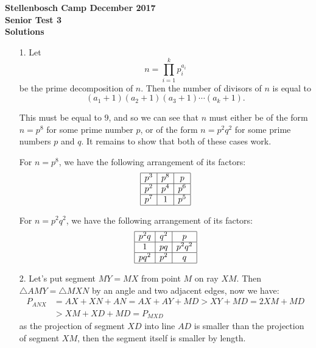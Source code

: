 \documentclass[a4paper, 12pt]{article}
\begin{document}
\begin{center}
\textbf{Stellenbosch Camp December 2017 \\ Senior Test 3} \\
\textbf{Solutions}
\end{center}

\begin{enumerate}

    \item[1.] Let
    \[
        n = \prod_{i=1}^{k} p_i^{a_i}
    \]
    be the prime decomposition of $n$. Then the number of divisors of $n$ is
    equal to
    \[
        (a_1 + 1)(a_2 + 1)(a_3 + 1) \cdots (a_k + 1).
    \]

    This must be equal to $9$, and so we can see that $n$ must either be of the
    form $n = p^8$ for some prime number $p$, or of the form $n = p^2 q^2$ for
    some prime numbers $p$ and $q$. It remains to show that both of these cases
    work.

    For $n = p^8$, we have the following arrangement of its factors:
    \[
        \begin{array}{|c|c|c|}
            \hline
            p^3 & p^8 & p \\
            \hline
            p^2 & p^4 & p^6 \\
            \hline
            p^7 & 1 & p^5 \\
            \hline
        \end{array}
    \]

    For $n = p^2 q^2$, we have the following arrangement of its factors:
    \[
        \begin{array}{|c|c|c|}
            \hline
            p^2 q & q^2 & p \\
            \hline
            1 & p q & p^2 q^2 \\
            \hline
            pq^2 & p^2 & q \\
            \hline
        \end{array}
    \]
    
    \item[2.] Let's put segment $MY = MX$ from point $M$ on ray $XM$. Then $\triangle AMY = \triangle MXN$ by an angle and two adjacent edges, now we have:
    \begin{align*}
        P_{ANX} &= AX + XN + AN = AX + AY + MD > XY + MD = 2XM + MD \\
        &> XM + XD + MD = P_{MXD}
    \end{align*}
    as the projection of segment $XD$ into line $AD$ is smaller than the projection of segment $XM$, then the segment itself is smaller by length.
    

\end{enumerate}
\end{document}
